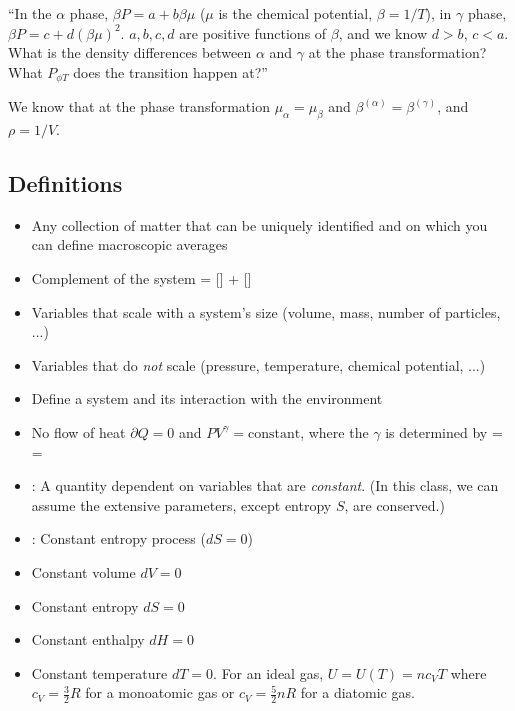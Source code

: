 \documentclass[12pt]{article}
\begin{document}
``In the $\alpha$ phase, $\beta P = a + b \beta \mu$ ($\mu$ is the chemical potential, $\beta = 1/T$), in $\gamma$ phase, $\beta P = c + d (\beta \mu)^2$.  $a,b,c,d$ are positive functions of $\beta$, and we know $d > b$, $c < a$.  What is the density differences between $\alpha$ and $\gamma$ at the phase transformation?  What $P_{\phi T}$ does the transition happen at?''

 We know that at the phase transformation $\mu_\alpha = \mu_\beta$ and $\beta^{(\alpha)} = \beta^{(\gamma)}$, and $\rho = 1/V$.

\subsection{Definitions}
\begin{itemize}
\item {} Any collection of matter that can be uniquely identified and on which you can define macroscopic averages
\item {}  Complement of the system
 = [] + []
\eqe
\item {} Variables that scale with a system's size (volume, mass, number of particles, ...)
\item {} Variables that do \emph{not} scale (pressure, temperature, chemical potential, ...)
\item {} Define a system and its interaction with the environment
\item {} No flow of heat $\partial Q = 0$ and $PV^{\gamma} = \text{constant}$, where the $\gamma$ is determined by
\eqs
\gamma =  = 
\eqe
\item {}: A quantity dependent on variables that are \emph{constant}.  (In this class, we can assume the extensive parameters, except entropy $S$, are conserved.)
\item {}: Constant entropy process ($dS=0$)
\item {} Constant volume $dV = 0$
\item {} Constant entropy $dS = 0$
\item {} Constant enthalpy $dH = 0$
\item {} Constant temperature $dT=0$.  For an ideal gas, $U = U(T) = n c_V T$ where $c_V = \frac{3}{2} R$ for a monoatomic gas or $c_V = \frac{5}{2} n R$ for a diatomic gas.

\end{itemize}
\end{document}
